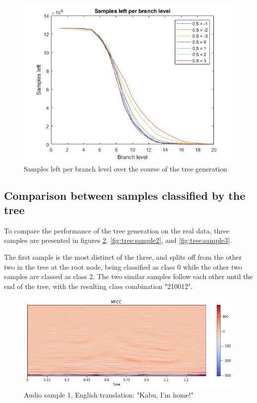 \begin{figure}  %
  \centering
  \includegraphics[width=.7\textwidth]{figures/treesampleloss.png}
  \caption{Samples left per branch level over the course of the tree generation}
  \label{fig:tree:sampleloss}
\end{figure}

\subsection{Comparison between samples classified by the tree}
\label{res:similar}

To compare the performance of the tree generation on the real data, three samples are presented in figures \cref{fig:tree:sample1}, \cref{fig:tree:sample2}, and \cref{fig:tree:sample3}.

The first sample is the most distinct of the three, and splits off from the other two in the tree at the root node, being classified as class 0 while the other two samples are classed as class 2.
The two similar samples follow each other until the end of the tree, with the resulting class combination "210012".

\begin{figure}  %
  \centering
  \includegraphics[width=.7\textwidth]{figures/sample1.png}
  \caption{Audio sample 1, English translation: "Kabu, I'm home!"}
  \label{fig:tree:sample1}
\end{figure}

